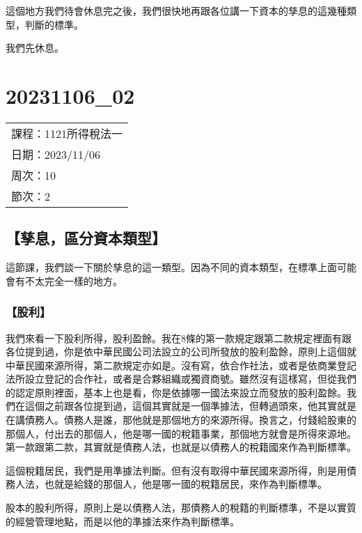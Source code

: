 \documentclass[]{ctexbook}
\begin{document}
這個地方我們待會休息完之後，我們很快地再跟各位講一下資本的孳息的這幾種類型，判斷的標準。

我們先休息。

\hypertarget{section-18}{%
\chapter{20231106\_02}\label{section-18}}

\begin{longtable}[]{@{}l@{}}
\toprule()
\endhead
課程：1121所得稅法一 \\
日期：2023/11/06 \\
周次：10 \\
節次：2 \\
\bottomrule()
\end{longtable}

\hypertarget{ux5b73ux606fux5340ux5206ux8cc7ux672cux985eux578b}{%
\section{【孳息，區分資本類型】}\label{ux5b73ux606fux5340ux5206ux8cc7ux672cux985eux578b}}

這節課，我們談一下關於孳息的這一類型。因為不同的資本類型，在標準上面可能會有不太完全一樣的地方。

\hypertarget{ux80a1ux5229}{%
\subsection{【股利】}\label{ux80a1ux5229}}

我們來看一下股利所得，股利盈餘。我在8條的第一款規定跟第二款規定裡面有跟各位提到過，你是依中華民國公司法設立的公司所發放的股利盈餘，原則上這個就中華民國來源所得，第二款規定亦如是。沒有寫，依合作社法，或者是依商業登記法所設立登記的合作社，或者是合夥組織或獨資商號。雖然沒有這樣寫，但從我們的認定原則裡面，基本上也是看，你是依據哪一國法來設立而發放的股利盈餘。我們在這個之前跟各位提到過，這個其實就是一個準據法，但轉過頭來，他其實就是在講債務人。債務人是誰，那他就是那個地方的來源所得。換言之，付錢給股東的那個人，付出去的那個人，他是哪一國的稅籍事業，那個地方就會是所得來源地。第一款跟第二款，其實就是債務人法，也就是以債務人的稅籍國來作為判斷標準。

這個稅籍居民，我們是用準據法判斷。但有沒有取得中華民國來源所得，則是用債務人法，也就是給錢的那個人，他是哪一國的稅籍居民，來作為判斷標準。

股本的股利所得，原則上是以債務人法，那債務人的稅籍的判斷標準，不是以實質的經營管理地點，而是以他的準據法來作為判斷標準。
\end{document}
